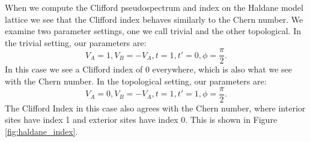 \documentclass[a4paper]{article}
\begin{document}

When we compute the Clifford pseudospectrum and index on the Haldane model lattice we see that the Clifford index behaves similarly to the Chern number.
We examine two parameter settings, one we call trivial and the other topological.
In the trivial setting, our parameters are:
\begin{equation}
V_A = 1, V_B = - V_A, t = 1, t' = 0, \phi = \frac{\pi}{2}.
\end{equation}
In this case we see a Clifford index of 0 everywhere, which is also what we see with the Chern number.
In the topological setting, our parameters are:
\begin{equation}
V_A = 0, V_B = - V_A, t = 1, t' = 1, \phi = \frac{\pi}{2}.
\end{equation}
The Clifford Index in this case also agrees with the Chern number, where interior sites have index 1 and exterior sites have index 0.
This is shown in Figure \ref{fig:haldane_index}.
\end{document}
